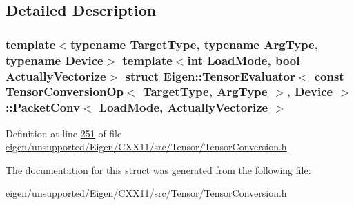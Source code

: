 \subsection{Detailed Description}
\subsubsection*{template$<$typename Target\+Type, typename Arg\+Type, typename Device$>$\newline
template$<$int Load\+Mode, bool Actually\+Vectorize$>$\newline
struct Eigen\+::\+Tensor\+Evaluator$<$ const Tensor\+Conversion\+Op$<$ Target\+Type, Arg\+Type $>$, Device $>$\+::\+Packet\+Conv$<$ Load\+Mode, Actually\+Vectorize $>$}



Definition at line \hyperlink{eigen_2unsupported_2_eigen_2_c_x_x11_2src_2_tensor_2_tensor_conversion_8h_source_l00251}{251} of file \hyperlink{eigen_2unsupported_2_eigen_2_c_x_x11_2src_2_tensor_2_tensor_conversion_8h_source}{eigen/unsupported/\+Eigen/\+C\+X\+X11/src/\+Tensor/\+Tensor\+Conversion.\+h}.



The documentation for this struct was generated from the following file\+:\begin{DoxyCompactItemize}
\item 
eigen/unsupported/\+Eigen/\+C\+X\+X11/src/\+Tensor/\+Tensor\+Conversion.\+h\end{DoxyCompactItemize}

